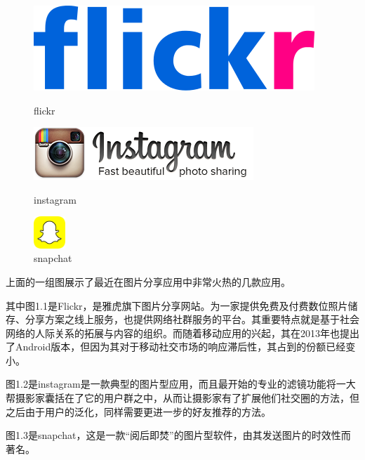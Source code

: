 \begin{figure}[h] 
\begin{minipage}[t]{0.3\linewidth}
\centering
\includegraphics[width=\textwidth]{img/chap1/flickr.png}
\caption{flickr \label{flickr}}
\end{minipage}
\hfill
\begin{minipage}[t]{0.3\linewidth}
\centering
\includegraphics[width=\textwidth]{img/chap1/instagram.png}
\caption{instagram\label{instagram}}
\end{minipage}
\begin{minipage}[t]{0.3\linewidth}
\centering
\includegraphics[width=1.2cm,height=1.2cm]{img/chap1/snapchat.png}
\caption{snapchat\label{snapchat}}
\end{minipage}

\end{figure}

上面的一组图展示了最近在图片分享应用中非常火热的几款应用。

其中图1.1是Flickr，是雅虎旗下图片分享网站。为一家提供免费及付费数位照片储存、分享方案之线上服务，也提供网络社群服务的平台。其重要特点就是基于社会网络的人际关系的拓展与内容的组织。而随着移动应用的兴起，其在2013年也提出了Android版本，但因为其对于移动社交市场的响应滞后性，其占到的份额已经变小。

图1.2是instagram是一款典型的图片型应用，而且最开始的专业的滤镜功能将一大帮摄影家囊括在了它的用户群之中，从而让摄影家有了扩展他们社交圈的方法，但之后由于用户的泛化，同样需要更进一步的好友推荐的方法。

图1.3是snapchat，这是一款“阅后即焚”的图片型软件，由其发送图片的时效性而著名。

